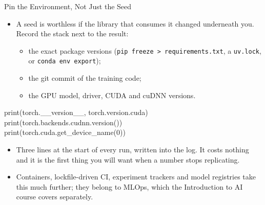 \begin{frame}{Pin the Environment, Not Just the Seed}
\begin{itemize}
    \item A seed is worthless if the library that consumes it changed underneath you. Record the stack next to the result:
    \begin{itemize}
        \item the exact package versions (\texttt{pip freeze > requirements.txt}, a \texttt{uv.lock}, or \texttt{conda env export});
        \item the git commit of the training code;
        \item the GPU model, driver, CUDA and cuDNN versions.
    \end{itemize}
\end{itemize}
\vspace{0.5em}
    \ttfamily\footnotesize{
    print(torch.\_\_version\_\_, torch.version.cuda) \\
    print(torch.backends.cudnn.version()) \\
    print(torch.cuda.get\_device\_name(0))
    }
\vspace{1em}
\begin{itemize}
    \item Three lines at the start of every run, written into the log. It costs nothing and it is the first thing you will want when a number stops replicating.
    \item Containers, lockfile-driven CI, experiment trackers and model registries take this much further; they belong to MLOps, which the Introduction to AI course covers separately.
\end{itemize}
\end{frame}

